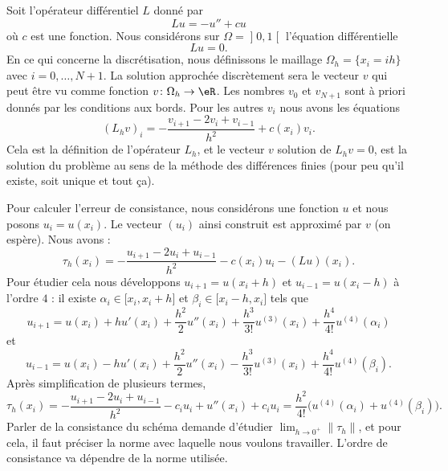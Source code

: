 Soit l'opérateur différentiel \( L\) donné par
\begin{equation}
	Lu=-u''+cu
\end{equation}
où \( c\) est une fonction. Nous considérons sur \( \Omega=\mathopen] 0 , 1 \mathclose[\) l'équation différentielle
\begin{equation}
	Lu=0.
\end{equation}
En ce qui concerne la discrétisation, nous définissons le maillage \( \Omega_h=\{x_i=ih\}\) avec \( i=0,\ldots, N+1\). La solution approchée discrètement sera le vecteur \( v\) qui peut être vu comme fonction \( v\colon \Omega_h\to \eR\). Les nombres \( v_0\) et \( v_{N+1}\) sont à priori donnés par les conditions aux bords. Pour les autres \( v_i\) nous avons les équations
\begin{equation}
	(L_hv)_i=-\frac{ v_{i+1}-2v_i+v_{i-1} }{ h^2 }+c(x_i)v_i.
\end{equation}
Cela est la définition de l'opérateur \( L_h\), et le vecteur \( v\) solution de \( L_hv=0\), est la solution du problème au sens de la méthode des différences finies (pour peu qu'il existe, soit unique et tout ça).

Pour calculer l'erreur de consistance, nous considérons une fonction \( u\) et nous posons \( u_i=u(x_i)\). Le vecteur \( (u_i)\) ainsi construit est approximé par \( v\) (on espère). Nous avons :
\begin{equation}
	\tau_h(x_i)=-\frac{ u_{i+1}-2u_i+u_{i-1} }{ h^2 }-c(x_i)u_i-(Lu)(x_i).
\end{equation}
Pour étudier cela nous développons \( u_{i+1}=u(x_i+h)\) et \( u_{i-1}=u(x_i-h)\) à l'ordre \( 4\) : il existe \( \alpha_i\in\mathopen[ x_i , x_i+h \mathclose]\) et \( \beta_i\in\mathopen[ x_i-h , x_i \mathclose]\) tels que
\begin{equation}
	u_{i+1}=u(x_i)+hu'(x_i)+\frac{ h^2 }{2}u''(x_i)+\frac{ h^3 }{ 3! }u^{(3)}(x_i)+\frac{ h^4 }{ 4! }u^{(4)}(\alpha_i)
\end{equation}
et
\begin{equation}
	u_{i-1}=u(x_i)-hu'(x_i)+\frac{ h^2 }{2}u''(x_i)-\frac{ h^3 }{ 3! }u^{(3)}(x_i)+\frac{ h^4 }{ 4! }u^{(4)}(\beta_i).
\end{equation}
Après simplification de plusieurs termes,
\begin{equation}
	\tau_h(x_i)=-\frac{ u_{i+1}-2u_i+u_{i-1} }{ h^2 }-c_iu_i+u''(x_i)+c_iu_i=\frac{ h^2 }{ 4! }\big( u^{(4)}(\alpha_i)+u^{(4)}(\beta_i) \big).
\end{equation}
Parler de la consistance du schéma demande d'étudier \( \lim_{h\to 0^+}\| \tau_h \| \), et pour cela, il faut préciser la norme avec laquelle nous voulons travailler. L'ordre de consistance va dépendre de la norme utilisée.

